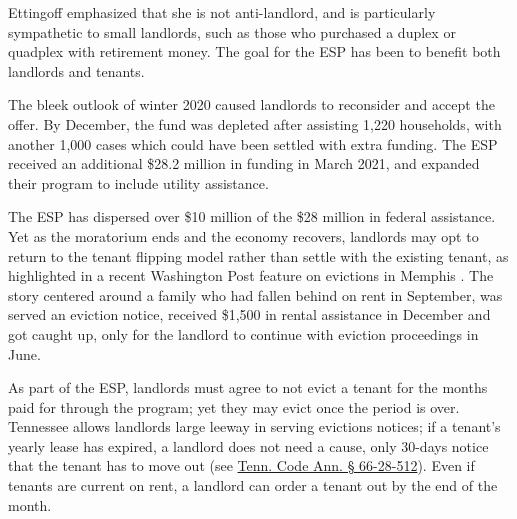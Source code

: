 \documentclass[
]{book}
\begin{document}
Ettingoff emphasized that she is not anti-landlord, and is particularly sympathetic to small landlords, such as those who purchased a duplex or quadplex with retirement money. The goal for the ESP has been to benefit both landlords and tenants.

The bleek outlook of winter 2020 caused landlords to reconsider and accept the offer. By December, the fund was depleted after assisting 1,220 households, with another 1,000 cases which could have been settled with extra funding. The ESP received an additional \$28.2 million in funding in March 2021, and expanded their program to include utility assistance.

The ESP has dispersed over \$10 million of the \$28 million in federal assistance. Yet as the moratorium ends and the economy recovers, landlords may opt to return to the tenant flipping model rather than settle with the existing tenant, as highlighted in a recent Washington Post feature on evictions in Memphis \citep{gowen2021}. The story centered around a family who had fallen behind on rent in September, was served an eviction notice, received \$1,500 in rental assistance in December and got caught up, only for the landlord to continue with eviction proceedings in June.

As part of the ESP, landlords must agree to not evict a tenant for the months paid for through the program; yet they may evict once the period is over. Tennessee allows landlords large leeway in serving evictions notices; if a tenant's yearly lease has expired, a landlord does not need a cause, only 30-days notice that the tenant has to move out (see \href{http://law.justia.com/codes/tennessee/2010/title-66/chapter-28/part-5/66-28-512}{Tenn. Code Ann. § 66-28-512}). Even if tenants are current on rent, a landlord can order a tenant out by the end of the month.
\end{document}
